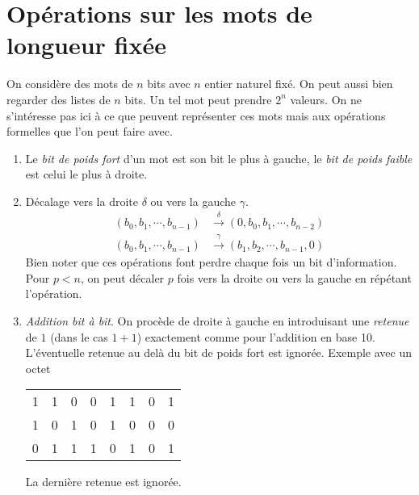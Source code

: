 \section{Opérations sur les mots de longueur fixée}
On considère des mots de $n$ bits avec $n$ entier naturel fixé. On peut aussi bien regarder des listes de $n$ bits. Un tel mot peut prendre $2^n$ valeurs. On ne s'intéresse pas ici à ce que peuvent représenter ces mots mais aux opérations formelles que l'on peut faire avec.
\begin{enumerate}
  \item Le \emph{bit de poids fort} d'un mot est son bit le plus à gauche, le \emph{bit de poids faible} est celui le plus à droite.
  \item Décalage vers la droite $\delta$ ou vers la gauche $\gamma$.
  \begin{align*}
    (b_0,b_1,\cdots,b_{n-1}) &\xrightarrow{\delta} (0, b_0,b_1,\cdots,b_{n-2}) \\
    (b_0,b_1,\cdots,b_{n-1}) &\xrightarrow{\gamma} (b_1,b_2,\cdots,b_{n-1}, 0)
  \end{align*}
Bien noter que ces opérations font perdre chaque fois un bit d'information. Pour $p<n$, on peut décaler $p$ fois vers la droite ou vers la gauche en répétant l'opération.
  \item \emph{Addition bit à bit}.\newline
  On procède de droite à gauche en introduisant une \emph{retenue} de $1$ (dans le cas $1+1$) exactement comme pour l'addition en base 10. L'éventuelle retenue au delà du bit de poids fort est ignorée.\newline
  Exemple avec un octet
  \begin{center}
  \begin{tabular}{cccccccc}
    1 & 1 & 0 & 0 & 1 & 1 & 0 & 1 \\ 
    1 & 0 & 1 & 0 & 1 & 0 & 0 & 0 \\ \hline
    0 & 1 & 1 & 1 & 0 & 1 & 0 & 1 \\ 
  \end{tabular}    
  \end{center}
La dernière retenue est ignorée.


\end{enumerate}
